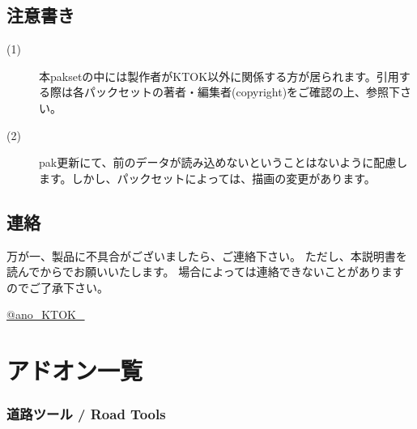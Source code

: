 \documentclass{jbook}
\begin{document}
\subsection*{注意書き}

\begin{description}
  \item[(1)]
    本paksetの中には製作者がKTOK以外に関係する方が居られます。引用する際は各パックセットの著者・編集者(copyright)をご確認の上、参照下さい。
  \item[(2)]
    pak更新にて、前のデータが読み込めないということはないように配慮します。しかし、パックセットによっては、描画の変更があります。
\end{description}

\subsection*{連絡}
万が一、製品に不具合がございましたら、ご連絡下さい。 ただし、本説明書を読んでからでお願いいたします。 場合によっては連絡できないことがありますのでご了承下さい。

\href{https://twitter.com/ano_KTOK_}{@ano\_KTOK\_}

\newpage

\section{アドオン一覧}



\subsubsection*{道路ツール / Road Tools}
\end{document}

